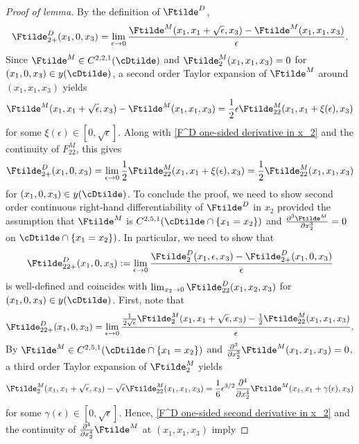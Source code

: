 \documentclass[11pt]{article}
\begin{document}
\begin{proof}[Proof of lemma]

By the definition of $\Ftilde^D$,
\begin{equation}
\label{F^D one-sided derivative in x_2}
\Ftilde^D_{2+}(x_1, 0, x_3) = \lim_{\epsilon \to 0} \frac{\Ftilde^M(x_1, x_1 + \sqrt{\epsilon}, x_3) - \Ftilde^M(x_1, x_1, x_3)}{\epsilon}.
\end{equation}
Since $\Ftilde^M \in C^{2,2,1}(\cDtilde)$ and $\Ftilde^M_{2}(x_1,x_1,x_3) = 0$ for $(x_1, 0, x_3) \in y(\cDtilde)$, a second order Taylor expansion of $\Ftilde^M$ around $(x_1, x_1, x_3)$ yields
$$
\Ftilde^M(x_1, x_1 + \sqrt{\epsilon}, x_3) - \Ftilde^M(x_1, x_1, x_3) = \frac{1}{2} \epsilon \Ftilde^M_{22}(x_1,x_1+\xi(\epsilon),x_3)
$$
for some $\xi(\epsilon) \in [0, \sqrt{\epsilon}]$. Along with \eqref{F^D one-sided derivative in x_2} and the continuity of $F^M_{22}$, this gives
$$
\Ftilde^D_{2+}(x_1, 0, x_3) = \lim_{\epsilon \to 0} \frac{1}{2} \Ftilde^M_{22}(x_1, x_1 + \xi(\epsilon), x_3) = \frac{1}{2} \Ftilde^M_{22}(x_1, x_1, x_3)
$$
for $(x_1, 0, x_3) \in y(\cDtilde)$. 
To conclude the proof, we need to show second order continuous right-hand differentiability of $\Ftilde^D$ in $x_2$ provided the assumption that $\Ftilde^M$ is $C^{2,5,1}(\cDtilde \cap \{ x_1 = x_2 \})$ and $\frac{\partial^3\Ftilde^M}{\partial x_2^3} = 0$ on $\cDtilde \cap \{ x_1 = x_2 \})$. In particular, we need to show that 
$$
\Ftilde^D_{22+}(x_1,0,x_3) := \lim_{\epsilon \to 0} \frac{\Ftilde^D_2(x_1, \epsilon, x_3) - \Ftilde^D_{2+}(x_1, 0, x_3)}{\epsilon}
$$
is well-defined and coincides with $\lim_{x_2 \to 0} \Ftilde^D_{22}(x_1, x_2, x_3)$ for $(x_1, 0 , x_3) \in y(\cDtilde)$. First, note that
\begin{equation}
\label{F^D one-sided second derivative in x_2}
\Ftilde^D_{22+}(x_1, 0, x_3) = \lim_{\epsilon \to 0} \frac{\frac{1}{2 \sqrt{\epsilon}} \Ftilde^M_2(x_1, x_1 + \sqrt{\epsilon}, x_3) - \frac{1}{2} \Ftilde^{M}_{22}(x_1, x_1, x_3)}{\epsilon}.
\end{equation}
By $\Ftilde^M \in C^{2,5,1}(\cDtilde \cap \{x_1 = x_2\})$ and $\frac{\partial^3}{\partial x_2^3} \Ftilde^M(x_1, x_1, x_3) = 0$, a third order Taylor expansion of $\Ftilde^M_2$ yields
$$
\Ftilde^M_2(x_1, x_1 + \sqrt{\epsilon}, x_3) - \sqrt{\epsilon} \Ftilde^M_{22}(x_1, x_1, x_3) = \frac{1}{6} \epsilon^{3/2} \frac{\partial^4}{\partial x_2^4} \Ftilde^M(x_1, x_1 + \gamma(\epsilon), x_3)
$$
for some $\gamma(\epsilon) \in [0, \sqrt{\epsilon}]$. Hence, \eqref{F^D one-sided second derivative in x_2} and the continuity of $\frac{\partial^4}{\partial x_2^4} \Ftilde^M$ at $(x_1, x_1, x_3)$ imply

\end{proof}
\end{document}
